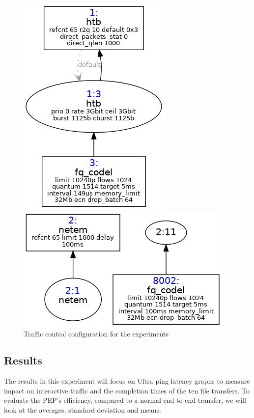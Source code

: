 \documentclass[a4paper,english, 11pt]{report}
\begin{document}
\begin{figure}[h!]
    \centering
    \begin{minipage}{.5\textwidth}
        \centering
        \includegraphics[scale=0.40]{../diagrams/tc/tc_5g_3gbit.png}
    \end{minipage}%
    \begin{minipage}{.5\textwidth}
        \centering
        \includegraphics[scale=0.40]{../diagrams/tc/tc_delay_fq.png}
    \end{minipage}
    \caption{Traffic control configuration for the experiments}
    \label{fig:tc_5g_fq_codel}
\end{figure}

\subsection{Results}

The results in this experiment will focus on Ultra ping latency graphs to measure impact on interactive traffic and the completion times of the ten file transfers. To evaluate the PEP's efficiency, compared to a normal end to end transfer, we will look at the averages, standard deviation and means.
\end{document}
